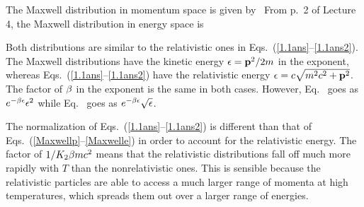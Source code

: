 {	
	The Maxwell distribution in momentum space is given by~\cite[p.~109]{Landau}
	From p.~2 of Lecture 4, the Maxwell distribution in energy space is
	
	Both distributions are similar to the relativistic ones in Eqs.~(\ref{1.1ans}--\ref{1.1ans2}).  The Maxwell distributions have the kinetic energy $\epsilon = \vb{p}^2 / 2m$ in the exponent, whereas Eqs.~(\ref{1.1ans}--\ref{1.1ans2}) have the relativistic energy $\epsilon = c \sqrt{m^2 c^2 + \vb{p}^2}$.  The factor of $\beta$ in the exponent is the same in both cases.  	However, Eq.~ goes as $e^{-\beta \epsilon} \epsilon^2$ while Eq.~ goes as $e^{-\beta \epsilon} \sqrt{\epsilon}$.
	
	The normalization of Eqs.~(\ref{1.1ans}--\ref{1.1ans2}) is different than that of Eqs.~(\ref{Maxwellp}--\ref{Maxwelle}) in order to account for the relativistic energy.  The factor of $1/K_2{\beta mc^2}$ means that the relativistic distributions fall off much more rapidly with $T$ than the nonrelativistic ones.  This is sensible because the relativistic particles are able to access a much larger range of momenta at high temperatures, which spreads them out over a larger range of energies.
}

%
%

\clearpage
{}

